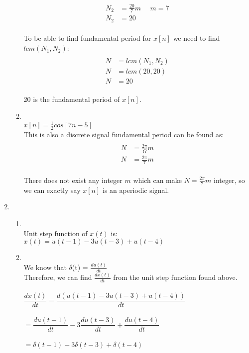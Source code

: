 \documentclass[10pt,a4paper, margin=1in]{article}
\begin{document}
\begin{enumerate}
\begin{enumerate}
\begin{align*}
            \\N_2&=\frac{20}{7}m \ \ \ \ \ \ m = 7 
            \\N_2&=20
        \end{align*}
        \\To be able to find fundamental period for $x[n]$ we need to find $lcm(N_1,N_2)$:
        \begin{align*}
            \\N &= lcm(N_1,N_2) 
            \\N &= lcm(20,20) 
            \\N&=20
        \end{align*}
        \\20 is the fundamental period of $x[n]$.
        \\
    \item %
        \\$x[n] = \frac{1}{2}cos[7n-5]$ 
        \\This is also a discrete signal fundamental period can be found as:
        \begin{align*}
            \\N&=\frac{2\pi}{\Omega}m 
            \\N&=\frac{2\pi}{7}m
        \end{align*}
        \\There does not exist any integer $m$ which can make $N=\frac{2\pi}{7}m$ integer, so we can exactly say $x[n]$ is an aperiodic signal. 
        \\
    \end{enumerate}

\newpage
\item %
    \begin{enumerate}
    \item %
        \\ Unit step function of $x(t)$ is:
        \\ $x(t) = u(t-1) - 3u(t-3) + u(t-4)$
        \\
    \item %
        \\We know that $\delta$(t) = $\frac{du(t)}{dt}$
        \\Therefore, we can find $\frac{dx(t)}{dt}$ from the unit step function found above. 
        \\\\$\dfrac{dx(t)}{dt} = \dfrac{d(u(t-1) - 3u(t-3) + u(t-4))}{dt}$
        \\\\$= \dfrac{du(t-1)}{dt} - 3\dfrac{du(t-3)}{dt} + \dfrac{du(t-4)}{dt}$
        \\\\$= \delta(t-1) - 3\delta(t-3) + \delta(t-4) $


\end{enumerate}
\end{enumerate}
\end{document}
